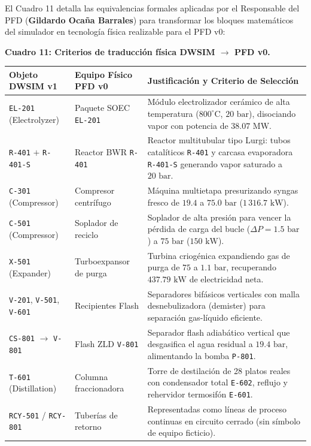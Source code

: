 \documentclass[11pt,letterpaper]{article}
\begin{document}
El Cuadro 11 detalla las equivalencias formales aplicadas por el Responsable del PFD (\textbf{Gildardo Ocaña Barrales}) para transformar los bloques matemáticos del simulador en tecnología física realizable para el PFD v0:

\begin{center}
\small
\textbf{Cuadro 11: Criterios de traducción física DWSIM $\to$ PFD v0.}\\[3pt]
\begin{tabularx}{\textwidth}{>{\raggedright\arraybackslash}p{3.4cm} >{\raggedright\arraybackslash}p{3.4cm} >{\raggedright\arraybackslash}X}
\toprule
\textbf{Objeto DWSIM v1} & \textbf{Equipo Físico PFD v0} & \textbf{Justificación y Criterio de Selección} \\
\midrule
\texttt{EL-201} (Electrolyzer) & Paquete SOEC \texttt{EL-201} & Módulo electrolizador cerámico de alta temperatura ($800^\circ\text{C}$, $20\text{ bar}$), disociando vapor con potencia de $38.07\text{ MW}$. \\
\texttt{R-401} $+$ \texttt{R-401-S} & Reactor BWR \texttt{R-401} & Reactor multitubular tipo Lurgi: tubos catalíticos \texttt{R-401} y carcasa evaporadora \texttt{R-401-S} generando vapor saturado a $20\text{ bar}$. \\
\texttt{C-301} (Compressor) & Compresor centrífugo & Máquina multietapa presurizando syngas fresco de $19.4$ a $75.0\text{ bar}$ ($1\,316.7\text{ kW}$). \\
\texttt{C-501} (Compressor) & Soplador de reciclo & Soplador de alta presión para vencer la pérdida de carga del bucle ($\Delta P = 1.5\text{ bar}$) a $75\text{ bar}$ ($150\text{ kW}$). \\
\texttt{X-501} (Expander) & Turboexpansor de purga & Turbina criogénica expandiendo gas de purga de $75$ a $1.1\text{ bar}$, recuperando $437.79\text{ kW}$ de electricidad neta. \\
\texttt{V-201}, \texttt{V-501}, \texttt{V-601} & Recipientes Flash & Separadores bifásicos verticales con malla desnebulizadora (demister) para separación gas-líquido eficiente. \\
\texttt{CS-801} $\to$ \texttt{V-801} & Flash ZLD \texttt{V-801} & Separador flash adiabático vertical que desgasifica el agua residual a $19.4\text{ bar}$, alimentando la bomba \texttt{P-801}. \\
\texttt{T-601} (Distillation) & Columna fraccionadora & Torre de destilación de 28 platos reales con condensador total \texttt{E-602}, reflujo y rehervidor termosifón \texttt{E-601}. \\
\texttt{RCY-501} / \texttt{RCY-801} & Tuberías de retorno & Representadas como líneas de proceso continuas en circuito cerrado (sin símbolo de equipo ficticio). \\
\bottomrule
\end{tabularx}
\end{center}
\end{document}

